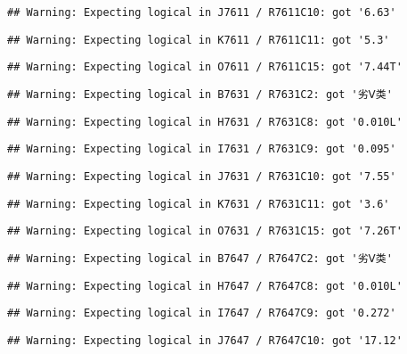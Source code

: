 \documentclass[
]{article}
\begin{document}
\begin{verbatim}
## Warning: Expecting logical in J7611 / R7611C10: got '6.63'
\end{verbatim}

\begin{verbatim}
## Warning: Expecting logical in K7611 / R7611C11: got '5.3'
\end{verbatim}

\begin{verbatim}
## Warning: Expecting logical in O7611 / R7611C15: got '7.44T'
\end{verbatim}

\begin{verbatim}
## Warning: Expecting logical in B7631 / R7631C2: got '劣Ⅴ类'
\end{verbatim}

\begin{verbatim}
## Warning: Expecting logical in H7631 / R7631C8: got '0.010L'
\end{verbatim}

\begin{verbatim}
## Warning: Expecting logical in I7631 / R7631C9: got '0.095'
\end{verbatim}

\begin{verbatim}
## Warning: Expecting logical in J7631 / R7631C10: got '7.55'
\end{verbatim}

\begin{verbatim}
## Warning: Expecting logical in K7631 / R7631C11: got '3.6'
\end{verbatim}

\begin{verbatim}
## Warning: Expecting logical in O7631 / R7631C15: got '7.26T'
\end{verbatim}

\begin{verbatim}
## Warning: Expecting logical in B7647 / R7647C2: got '劣Ⅴ类'
\end{verbatim}

\begin{verbatim}
## Warning: Expecting logical in H7647 / R7647C8: got '0.010L'
\end{verbatim}

\begin{verbatim}
## Warning: Expecting logical in I7647 / R7647C9: got '0.272'
\end{verbatim}

\begin{verbatim}
## Warning: Expecting logical in J7647 / R7647C10: got '17.12'
\end{verbatim}
\end{document}
